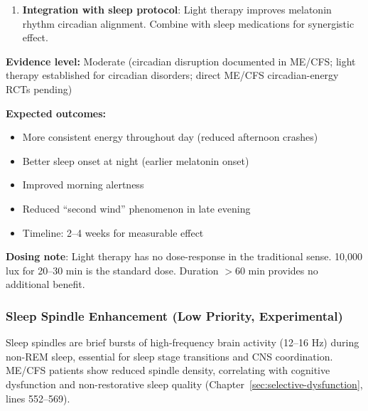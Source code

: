 \begin{recommendation}
\begin{enumerate}
    \item \textbf{Integration with sleep protocol}: Light therapy improves melatonin rhythm circadian alignment. Combine with sleep medications for synergistic effect.
\end{enumerate}

\textbf{Evidence level:} Moderate (circadian disruption documented in ME/CFS; light therapy established for circadian disorders; direct ME/CFS circadian-energy RCTs pending)

\textbf{Expected outcomes:}
\begin{itemize}
    \item More consistent energy throughout day (reduced afternoon crashes)
    \item Better sleep onset at night (earlier melatonin onset)
    \item Improved morning alertness
    \item Reduced ``second wind'' phenomenon in late evening
    \item Timeline: 2--4 weeks for measurable effect
\end{itemize}

\textbf{Dosing note}: Light therapy has no dose-response in the traditional sense. 10,000 lux for 20--30 min is the standard dose. Duration $>$60 min provides no additional benefit.

\end{recommendation}

\subsubsection{Sleep Spindle Enhancement (Low Priority, Experimental)}
\label{subsubsec:sleep-spindle-enhancement-severe}

\begin{keypoint}
Sleep spindles are brief bursts of high-frequency brain activity (12--16 Hz) during non-REM sleep, essential for sleep stage transitions and CNS coordination. ME/CFS patients show reduced spindle density, correlating with cognitive dysfunction and non-restorative sleep quality (Chapter~\ref{sec:selective-dysfunction}, lines 552--569).
\end{keypoint}


